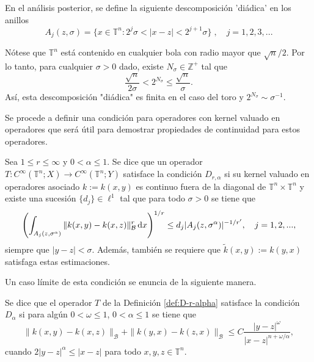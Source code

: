 En el análisis posterior, se define la siguiente descomposición 'diádica' en los anillos
\begin{equation}
	A_j(z, \sigma) = \{ x \in \mathbb{T}^n : 2^j\sigma < |x-z|<2^{j+1}\sigma \} \; , \quad j=1, 2, 3, ...
\end{equation}
\begin{remark}
	Nótese que $\mathbb{T}^n$ está contenido en cualquier bola con radio mayor que $\sqrt{n}/2$. Por lo tanto, para cualquier $\sigma>0$ dado, existe $N_\sigma\in \mathbb{Z}^+$ tal que 
	\begin{equation}
		\frac{\sqrt{n}}{2\sigma} < 2^{N_\sigma} \leq \frac{\sqrt{n}}{\sigma}.
	\end{equation}
	Así, esta descomposición "diádica" es finita en el caso del toro y $2^{N_\sigma} \sim \sigma^{-1}$.
	\label{rem:N-sigma}
\end{remark}
Se procede a definir una condición para operadores con kernel valuado en operadores que será útil para demostrar propiedades de continuidad para estos operadores.
\begin{definition} Sea $1\leq r\leq\infty$ y $0<\alpha\leq1$. Se dice que un operador $T:C^\infty(\mathbb{T}^n;X)\rightarrow C^\infty(\mathbb{T}^n;Y)$ satisface la condición $D_{r,\alpha}$ si su kernel valuado en operadores asociado $k:=k(x,y)$ es continuo fuera de la diagonal de $\mathbb{T}^n\times\mathbb{T}^n$ y existe una sucesión $\{d_j\}\in \ell^1$ tal que para todo $\sigma>0$ se tiene que 
	\begin{equation*}
		\left( \int_{A_j(z,\sigma^\alpha)} \|k(x, y) - k(x, z)\|^r_\mathcal{B} \mathop{}\!\mathrm{d} x \right)^{1/r} \leq d_j|A_j(z,\sigma^\alpha)|^{-1/r'}, \quad j=1,2,... ,
	\end{equation*}
	siempre que $|y-z|<\sigma$. Además, también se requiere que $\tilde{k}(x, y) := k(y, x)$ satisfaga estas estimaciones.
	\label{def:D-r-alpha}
\end{definition}
Un caso límite de esta condición se enuncia de la siguiente manera.
\begin{remark}
	Se dice que el operador $T$ de la Definición \ref{def:D-r-alpha} satisface la condición $D_\alpha$ si para algún $0<\omega\leq1$, $0<\alpha\leq1$ se tiene que
	\begin{equation*}
		\|k(x,y)-k(x, z)\|_\mathcal{B}+\|k(y, x)-k(z, x)\|_\mathcal{B} \leq C \frac{|y-z|^\omega}{|x-z|^{n+\omega/\alpha}},
	\end{equation*}
	cuando $2|y-z|^\alpha \leq |x - z|$ para todo $x, y, z\in \mathbb{T}^n$. 
	\label{rem:D-alpha-condition}
\end{remark}
